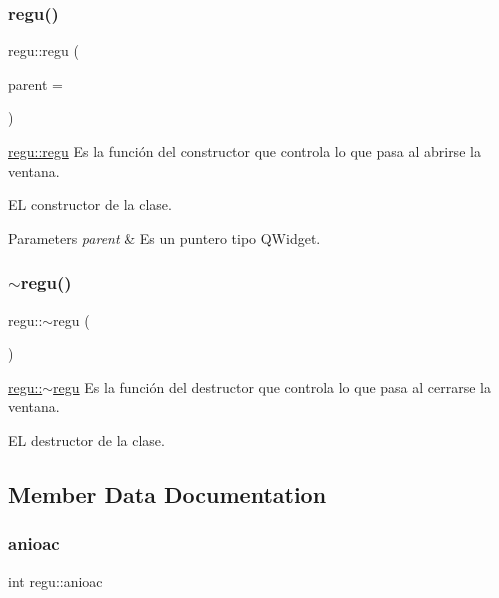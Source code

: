 \subsubsection{\texorpdfstring{regu()}{regu()}}
{\footnotesize\ttfamily regu\+::regu (\begin{DoxyParamCaption}\item[{Q\+Widget $\ast$}]{parent = {} }\end{DoxyParamCaption})\hspace{0.3cm}{\ttfamily [explicit]}}



\hyperlink{classregu_a4233920e912063eba919a7031cadc10a}{regu\+::regu} Es la función del constructor que controla lo que pasa al abrirse la ventana. 

EL constructor de la clase.


\begin{DoxyParams}{Parameters}
{\em parent} & Es un puntero tipo Q\+Widget. \\
\hline
\end{DoxyParams}
\mbox{\label{classregu_af4ce8301d06b2636e666ac5c9cf46e36}} 
\subsubsection{\texorpdfstring{$\sim$regu()}{~regu()}}
{\footnotesize\ttfamily regu\+::$\sim$regu (\begin{DoxyParamCaption}{ }\end{DoxyParamCaption})}



\hyperlink{classregu_af4ce8301d06b2636e666ac5c9cf46e36}{regu\+::$\sim$regu} Es la función del destructor que controla lo que pasa al cerrarse la ventana. 

EL destructor de la clase. 

\subsection{Member Data Documentation}
\mbox{\label{classregu_a8e1e0b50d736177379adb192386bba2d}} 
\subsubsection{\texorpdfstring{anioac}{anioac}}
{\footnotesize\ttfamily int regu\+::anioac}

